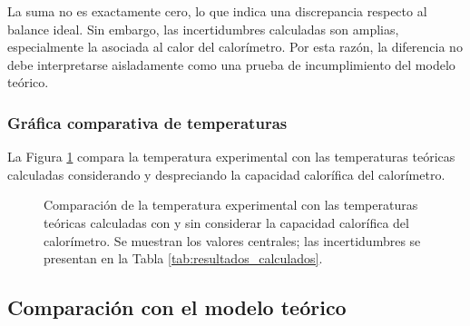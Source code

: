 La suma no es exactamente cero, lo que indica una discrepancia respecto al balance ideal. Sin embargo, las incertidumbres calculadas son amplias, especialmente la asociada al calor del calorímetro. Por esta razón, la diferencia no debe interpretarse aisladamente como una prueba de incumplimiento del modelo teórico.

\subsubsection{Gráfica comparativa de temperaturas}

La Figura \ref{fig:comparacion_temperaturas} compara la temperatura experimental con las temperaturas teóricas calculadas considerando y despreciando la capacidad calorífica del calorímetro.

\begin{figure}[H]
    \centering
    \caption{Comparación de la temperatura experimental con las temperaturas teóricas calculadas con y sin considerar la capacidad calorífica del calorímetro. Se muestran los valores centrales; las incertidumbres se presentan en la Tabla \ref{tab:resultados_calculados}.}
    \label{fig:comparacion_temperaturas}
\end{figure}


\subsection{Comparación con el modelo teórico}
\label{subsec:comparacion_teorica}

